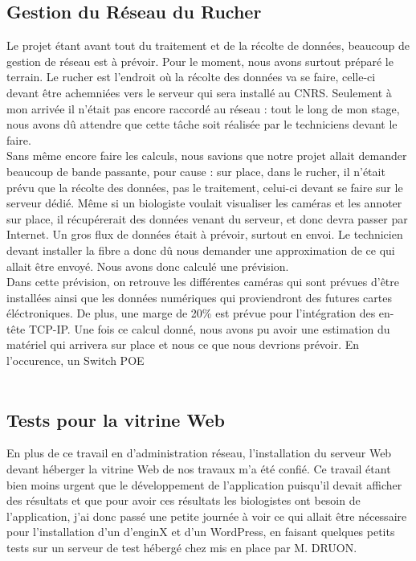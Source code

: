 \documentclass[11pt,french,a4paper]{report}
\begin{document}
        \subsection{Gestion du Réseau du Rucher}
Le projet étant avant tout du traitement et de la récolte de données, beaucoup de gestion de réseau est à prévoir. Pour le moment,
nous avons surtout préparé le terrain. Le rucher est l'endroit où la récolte des données va se faire, celle-ci devant être achemniées vers
le serveur qui sera installé au CNRS. Seulement à mon arrivée il n'était pas encore raccordé au réseau : tout le long de mon stage, 
nous avons dû attendre que cette tâche soit réalisée par le techniciens devant le faire. \\
Sans même encore faire les calculs, nous savions que notre projet allait demander beaucoup de bande passante, pour cause :
sur place, dans le rucher, il n'était prévu que la récolte des données, pas le traitement, celui-ci devant se faire sur le serveur dédié. 
Même si un biologiste voulait visualiser les caméras et les annoter sur place, il récupérerait des données venant du serveur, et donc 
devra passer par Internet. Un gros flux de données était à prévoir, surtout en envoi. Le technicien devant installer la fibre a 
donc dû nous demander une approximation de ce qui allait être envoyé. Nous avons donc calculé une prévision. \\
Dans cette prévision, on retrouve les différentes caméras qui sont prévues d'être installées ainsi que les données numériques qui proviendront des 
futures cartes éléctroniques. De plus, une marge de 20\% est prévue pour l'intégration des en-tête TCP-IP. Une fois ce calcul donné, 
nous avons pu avoir une estimation du matériel qui arrivera sur place et nous ce que nous devrions prévoir. En l'occurence, 
un Switch POE  \\ 

        \subsection{Tests pour la vitrine Web}
En plus de ce travail en d'administration réseau, l'installation du serveur Web devant héberger la vitrine Web de nos travaux m'a été confié. 
Ce travail étant bien moins urgent que le développement de l'application puisqu'il devait afficher des résultats et que pour avoir ces 
résultats les biologistes ont besoin de l'application, j'ai donc passé une petite journée à voir ce qui allait être nécessaire pour l'installation
d'un d'enginX et d'un WordPress, en faisant quelques petits tests sur un serveur de test hébergé chez %
mis en place par M. DRUON. \\
\end{document}
